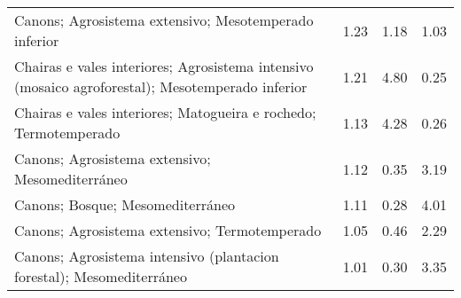 \begin{table}[p]
\begin{tabular}{lrrr}
  Canons; Agrosistema extensivo; Mesotemperado inferior & 1.23 & 1.18 & 1.03 \\ 
  Chairas e vales interiores; Agrosistema intensivo (mosaico agroforestal); Mesotemperado inferior & 1.21 & 4.80 & 0.25 \\ 
  Chairas e vales interiores; Matogueira e rochedo; Termotemperado & 1.13 & 4.28 & 0.26 \\ 
  Canons; Agrosistema extensivo; Mesomediterráneo & 1.12 & 0.35 & 3.19 \\ 
  Canons; Bosque; Mesomediterráneo & 1.11 & 0.28 & 4.01 \\ 
  Canons; Agrosistema extensivo; Termotemperado & 1.05 & 0.46 & 2.29 \\ 
  Canons; Agrosistema intensivo (plantacion forestal); Mesomediterráneo & 1.01 & 0.30 & 3.35 \\ 
   \hline
\end{tabular}
\end{table}
